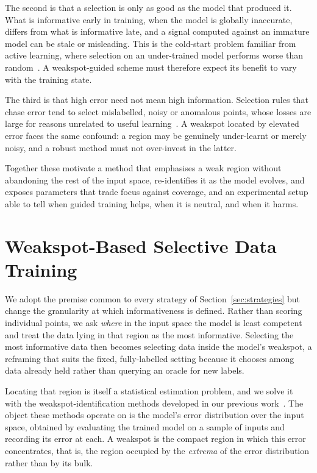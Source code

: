 \documentclass[conference]{IEEEtran}
\begin{document}
The second is that a selection is only as good as the model that produced it. What is
informative early in training, when the model is globally inaccurate, differs from what
is informative late, and a signal computed against an immature model can be stale or
misleading. This is the cold-start problem familiar from active learning, where selection
on an under-trained model performs worse than
random~\cite{mindermann2022,chen2022coldstart}. A weakspot-guided scheme must therefore
expect its benefit to vary with the training state.

The third is that high error need not mean high information. Selection rules that chase
error tend to select mislabelled, noisy or anomalous points, whose losses are large for
reasons unrelated to useful learning~\cite{mindermann2022}. A weakspot located by
elevated error faces the same confound: a region may be genuinely under-learnt or merely
noisy, and a robust method must not over-invest in the latter.

Together these motivate a method that emphasises a weak region without abandoning the
rest of the input space, re-identifies it as the model evolves, and exposes parameters
that trade focus against coverage, and an experimental setup able to tell when guided
training helps, when it is neutral, and when it harms.

\section{Weakspot-Based Selective Data Training}
\label{sec:approach}

We adopt the premise common to every strategy of Section~\ref{sec:strategies} but
change the granularity at which informativeness is defined. Rather than scoring
individual points, we ask \emph{where} in the input space the model is least
competent and treat the data lying in that region as the most informative.
Selecting the most informative data then becomes selecting data inside the model's
weakspot, a reframing that suits the fixed, fully-labelled setting because it
chooses among data already held rather than querying an oracle for new labels.

Locating that region is itself a statistical estimation problem, and we solve it
with the weakspot-identification methods developed in our previous
work~\cite{weakspotprior}. The object these methods operate on is the model's
error distribution over the input space, obtained by evaluating the trained model
on a sample of inputs and recording its error at each. A weakspot is the compact
region in which this error concentrates, that is, the region occupied by the
\emph{extrema} of the error distribution rather than by its bulk.
\end{document}
